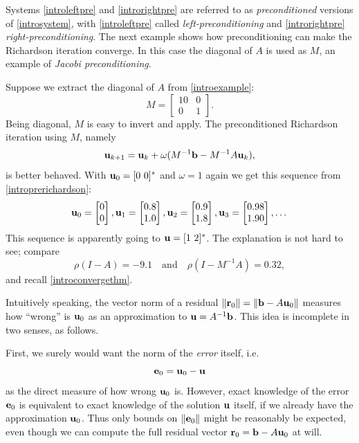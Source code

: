 Systems \eqref{introleftpre} and \eqref{introrightpre} are referred to as \emph{preconditioned} versions of \eqref{introsystem}, with \eqref{introleftpre} called \emph{left-preconditioning} and \eqref{introrightpre} \emph{right-preconditioning}.  The next example shows how preconditioning can make the Richardson iteration converge.  In this case the diagonal of $A$ is used as $M$, an example of \emph{Jacobi preconditioning}.

\medskip\noindent\hrulefill
\begin{examplecont} \label{example:ls:jacobirichardson}  Suppose we extract the diagonal of $A$ from  \eqref{introexample}:
\begin{equation}
M = \begin{bmatrix}
10 & 0 \\ 0 & 1
\end{bmatrix}.  \label{introM}
\end{equation}
Being diagonal, $M$ is easy to invert and apply.  The preconditioned Richardson iteration using $M$, namely
\begin{equation}
\mathbf{u}_{k+1} = \mathbf{u}_k + \omega (M^{-1} \mathbf{b} - M^{-1} A \mathbf{u}_k),  \label{introprerichardson}
\end{equation}
is better behaved.  With $\mathbf{u}_0 = [0\,\, 0]^*$ and $\omega=1$ again we get this sequence from \eqref{introprerichardson}:
\begin{equation}
{\mathbf{u}}_{0} = \begin{bmatrix} 0 \\ 0 \end{bmatrix}, {\mathbf{u}}_{1} = \begin{bmatrix} 0.8 \\ 1.0 \end{bmatrix}, {\mathbf{u}}_{2} = \begin{bmatrix} 0.9 \\ 1.8 \end{bmatrix}, {\mathbf{u}}_{3} = \begin{bmatrix} 0.98 \\ 1.90 \end{bmatrix}, \dots
\end{equation}
This sequence is apparently going to $\mathbf{u} = [1\,\, 2]^*$.  The explanation is not hard to see; compare
\begin{equation}
\rho(I-A) = -9.1 \quad \text{and} \quad \rho(I-M^{-1} A) = 0.32,
\end{equation}
and recall \eqref{introconvergethm}.
\end{examplecont}
\noindent\hrulefill

\medskip
Intuitively speaking, the vector norm of a residual $\|\mathbf{r}_0\| = \|\mathbf{b} - A \mathbf{u}_0\|$ measures how ``wrong'' is $\mathbf{u}_0$ as an approximation to $\mathbf{u}=A^{-1}\mathbf{b}$.  This idea is incomplete in two senses, as follows.

First, we surely would want the norm of the \emph{error} itself, i.e.
\begin{equation}
\mathbf{e}_0 = \mathbf{u}_0 - \mathbf{u} \label{errordefn}
\end{equation}
as the direct measure of how wrong $\mathbf{u}_0$ is.  However, exact knowledge of the error $\mathbf{e}_0$ is equivalent to exact knowledge of the solution $\mathbf{u}$ itself, if we already have the approximation $\mathbf{u}_0$.  Thus only bounds on $\|\mathbf{e}_0\|$ might be reasonably be expected, even though we can compute the full residual vector $\mathbf{r}_0 = \mathbf{b} - A \mathbf{u}_0$ at will.

